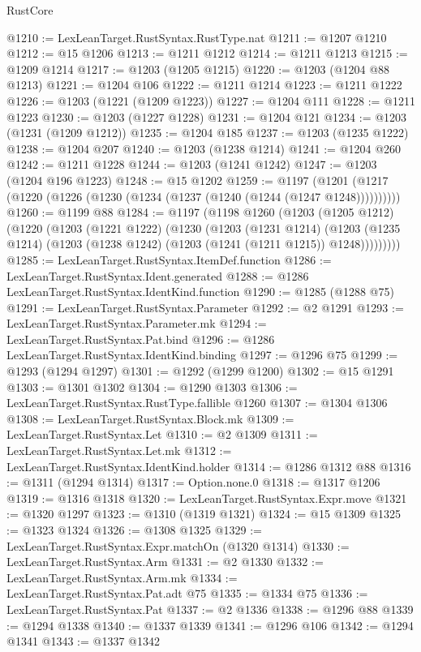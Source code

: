 \begin{lexlean}{RustCore}
\begin{coremodule}
@1210 := LexLeanTarget.RustSyntax.RustType.nat
@1211 := @1207 @1210
@1212 := @15 @1206
@1213 := @1211 @1212
@1214 := @1211 @1213
@1215 := @1209 @1214
@1217 := @1203 (@1205 @1215)
@1220 := @1203 (@1204 @88 @1213)
@1221 := @1204 @106
@1222 := @1211 @1214
@1223 := @1211 @1222
@1226 := @1203 (@1221 (@1209 @1223))
@1227 := @1204 @111
@1228 := @1211 @1223
@1230 := @1203 (@1227 @1228)
@1231 := @1204 @121
@1234 := @1203 (@1231 (@1209 @1212))
@1235 := @1204 @185
@1237 := @1203 (@1235 @1222)
@1238 := @1204 @207
@1240 := @1203 (@1238 @1214)
@1241 := @1204 @260
@1242 := @1211 @1228
@1244 := @1203 (@1241 @1242)
@1247 := @1203 (@1204 @196 @1223)
@1248 := @15 @1202
@1259 := @1197 (@1201 (@1217 (@1220 (@1226 (@1230 (@1234 (@1237 (@1240 (@1244 (@1247 @1248))))))))))
@1260 := @1199 @88
@1284 := @1197
    (@1198
      @1260
      (@1203
        (@1205 @1212)
        (@1220
          (@1203
            (@1221 @1222)
            (@1230
              (@1203
                (@1231 @1214)
                (@1203
                  (@1235 @1214)
                  (@1203 (@1238 @1242) (@1203 (@1241 (@1211 @1215)) @1248)))))))))
@1285 := LexLeanTarget.RustSyntax.ItemDef.function
@1286 := LexLeanTarget.RustSyntax.Ident.generated
@1288 := @1286 LexLeanTarget.RustSyntax.IdentKind.function
@1290 := @1285 (@1288 @75)
@1291 := LexLeanTarget.RustSyntax.Parameter
@1292 := @2 @1291
@1293 := LexLeanTarget.RustSyntax.Parameter.mk
@1294 := LexLeanTarget.RustSyntax.Pat.bind
@1296 := @1286 LexLeanTarget.RustSyntax.IdentKind.binding
@1297 := @1296 @75
@1299 := @1293 (@1294 @1297)
@1301 := @1292 (@1299 @1200)
@1302 := @15 @1291
@1303 := @1301 @1302
@1304 := @1290 @1303
@1306 := LexLeanTarget.RustSyntax.RustType.fallible @1260
@1307 := @1304 @1306
@1308 := LexLeanTarget.RustSyntax.Block.mk
@1309 := LexLeanTarget.RustSyntax.Let
@1310 := @2 @1309
@1311 := LexLeanTarget.RustSyntax.Let.mk
@1312 := LexLeanTarget.RustSyntax.IdentKind.holder
@1314 := @1286 @1312 @88
@1316 := @1311 (@1294 @1314)
@1317 := Option.none.{0}
@1318 := @1317 @1206
@1319 := @1316 @1318
@1320 := LexLeanTarget.RustSyntax.Expr.move
@1321 := @1320 @1297
@1323 := @1310 (@1319 @1321)
@1324 := @15 @1309
@1325 := @1323 @1324
@1326 := @1308 @1325
@1329 := LexLeanTarget.RustSyntax.Expr.matchOn (@1320 @1314)
@1330 := LexLeanTarget.RustSyntax.Arm
@1331 := @2 @1330
@1332 := LexLeanTarget.RustSyntax.Arm.mk
@1334 := LexLeanTarget.RustSyntax.Pat.adt @75
@1335 := @1334 @75
@1336 := LexLeanTarget.RustSyntax.Pat
@1337 := @2 @1336
@1338 := @1296 @88
@1339 := @1294 @1338
@1340 := @1337 @1339
@1341 := @1296 @106
@1342 := @1294 @1341
@1343 := @1337 @1342

\end{coremodule}
\end{lexlean}
